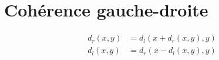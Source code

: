 \documentclass[a4paper,11pt]{article}
\begin{document}
\section{Cohérence gauche-droite}

\begin{equation}
\begin{aligned}
d_r(x,y) &= d_l(x+d_r(x,y),y) \\
d_l(x,y) &= d_r(x-d_l(x,y),y) \\
\end{aligned}
\end{equation}


\begin{figure}[H]
  \centering
\end{figure}
\end{document}
